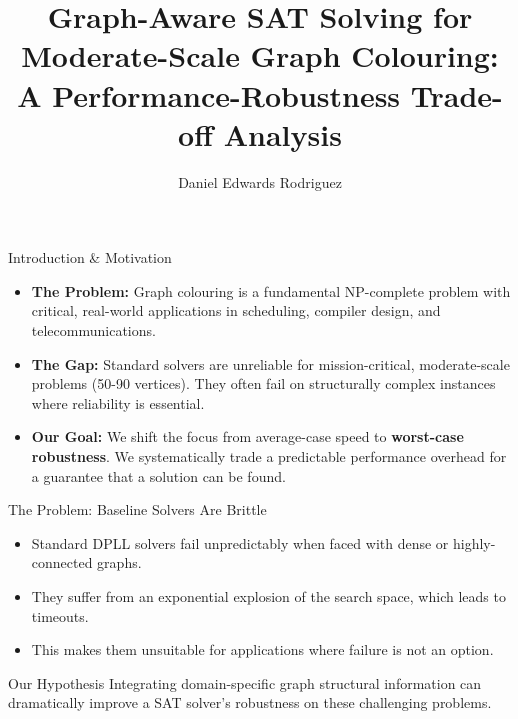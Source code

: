 \documentclass[11pt]{beamer}
\author[Daniel Edwards Rodriguez]{Daniel Edwards Rodriguez}
\title[Graph-Aware SAT Solving]{Graph-Aware SAT Solving for Moderate-Scale Graph Colouring: A Performance-Robustness Trade-off Analysis}
\institute[King's College London]{King's College London \\ Supervisor: Professor Hana Chockler}
\begin{document}
\begin{frame}
\titlepage
\end{frame}

\begin{frame}{Introduction \& Motivation}
    \begin{itemize}
        \item \textbf{The Problem:} Graph colouring is a fundamental NP-complete problem with critical, real-world applications in scheduling, compiler design, and telecommunications.
        \item \textbf{The Gap:} Standard solvers are unreliable for mission-critical, moderate-scale problems (50-90 vertices). They often fail on structurally complex instances where reliability is essential.
        \item \textbf{Our Goal:} We shift the focus from average-case speed to \textbf{worst-case robustness}. We systematically trade a predictable performance overhead for a guarantee that a solution can be found.
    \end{itemize}
\end{frame}

\begin{frame}{The Problem: Baseline Solvers Are Brittle}
    \begin{itemize}
        \item Standard DPLL solvers fail unpredictably when faced with dense or highly-connected graphs.
        \item They suffer from an exponential explosion of the search space, which leads to timeouts.
        \item This makes them unsuitable for applications where failure is not an option.
    \end{itemize}
    \vfill
    \begin{block}{Our Hypothesis}
        Integrating domain-specific graph structural information can dramatically improve a SAT solver's robustness on these challenging problems.
    \end{block}
\end{frame}
\end{document}
